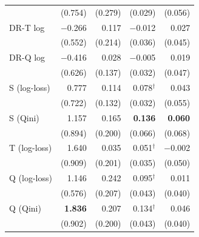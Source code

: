 \documentclass{article}
\begin{document}
\begin{table}[H]
\begin{tabular}{l|rrrr}
 & \scriptsize (0.754) & \scriptsize (0.279) & \scriptsize (0.029) & \scriptsize (0.056) \\[2pt]
DR-T log & $-$0.266 & 0.117 & $-$0.012 & 0.027 \\
 & \scriptsize (0.552) & \scriptsize (0.214) & \scriptsize (0.036) & \scriptsize (0.045) \\[2pt]
DR-Q log & $-$0.416 & 0.028 & $-$0.005 & 0.019 \\
 & \scriptsize (0.626) & \scriptsize (0.137) & \scriptsize (0.032) & \scriptsize (0.047) \\[2pt]
\hline
S (log-loss) & 0.777 & 0.114 & 0.078$^\dagger$ & 0.043 \\
 & \scriptsize (0.722) & \scriptsize (0.132) & \scriptsize (0.032) & \scriptsize (0.055) \\[2pt]
S (Qini) & 1.157 & 0.165 & \textbf{0.136} & \textbf{0.060} \\
 & \scriptsize (0.894) & \scriptsize (0.200) & \scriptsize (0.066) & \scriptsize (0.068) \\[2pt]
T (log-loss) & 1.640 & 0.035 & 0.051$^\dagger$ & $-$0.002 \\
 & \scriptsize (0.909) & \scriptsize (0.201) & \scriptsize (0.035) & \scriptsize (0.050) \\[2pt]
Q (log-loss) & 1.146 & 0.242 & 0.095$^\dagger$ & 0.011 \\
 & \scriptsize (0.576) & \scriptsize (0.207) & \scriptsize (0.043) & \scriptsize (0.040) \\[2pt]
Q (Qini) & \textbf{1.836} & 0.207 & 0.134$^\dagger$ & 0.046 \\
 & \scriptsize (0.902) & \scriptsize (0.200) & \scriptsize (0.043) & \scriptsize (0.040) \\[2pt]
\hline
\end{tabular}
\end{table}
\end{document}
